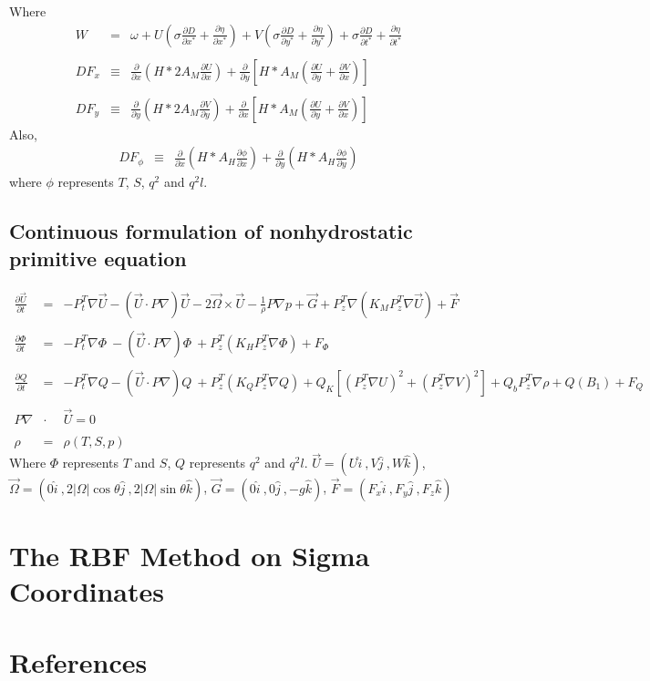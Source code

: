 \documentclass[oribibl]{llncs}
\begin{document}
Where 
\begin{eqnarray}
W&=& \omega +  U\left( \sigma\frac{\partial D}{\partial x^*} +\frac{\partial \eta}{\partial x^*} \right) +V \left(\sigma \frac{\partial D}{\partial y^*}+\frac{\partial \eta}{\partial y^*} \right) + \sigma \frac{\partial D}{\partial t^*} + \frac{\partial \eta}{\partial t^*} \\ \nonumber \\
DF_x &\equiv& \frac{\partial}{\partial x} (H*2A_M\frac{\partial U}{\partial x}) + \frac{\partial}{\partial y} \left [ H*A_M(\frac{\partial U}{\partial y}+\frac{\partial V}{\partial x}) \right] \\ \nonumber \\
DF_y &\equiv& \frac{\partial}{\partial y} (H*2A_M \frac{\partial V}{\partial y}) + \frac{\partial}{\partial x} \left[ H*A_M(\frac{\partial U}{\partial y}+\frac{\partial V}{\partial x}) \right] 
\end{eqnarray}
Also,
\begin{eqnarray}
DF_\phi &\equiv& \frac{\partial}{\partial x}(H*A_H\frac{\partial \phi}{\partial x}) + \frac{\partial}{\partial y}(H*A_H\frac{\partial \phi}{\partial y}) 
\end{eqnarray}
where $\phi$ represents $T$, $S$, $q^2$ and $q^2 l$. \\
\subsection{Continuous formulation of nonhydrostatic primitive equation}
\begin{eqnarray}
\frac{\partial {\vec{U}}}{\partial t} &=& -P^T_t \nabla {\vec{U}} - \left(\vec{U} \cdot P \nabla \right) \vec{U} - 2\vec{\Omega} \times \vec{U}-\frac{1}{\rho}P\nabla p+ \vec{G} + P^T_z \nabla \left( K_M P^T_z \nabla {\vec{U}} \right) + \vec{F} \\ \nonumber \\ 
\frac{\partial {\Phi}}{\partial t}    &=& -P^T_t \nabla \Phi \ - (\vec{U} \cdot P \nabla) \Phi \ + P^T_z \left(K_HP^T_z \nabla \Phi \right)+F_\Phi \\ \nonumber \\ 
\frac{\partial Q}{\partial t} &=& -P^T_t \nabla Q - \left(\vec{U} \cdot P \nabla \right) Q \ +  P^T_z \left(K_QP^T_z \nabla Q \right) + Q_K \left [(P^T_z\nabla U)^2+(P^T_z \nabla V)^2 \right] + Q_b P^T_z \nabla \rho +Q(B_1)  + F_Q \\ \nonumber \\ 
P\nabla  &\cdot  &\vec{U}=0  \\ \nonumber \\ 
\rho &=& \rho(T,S,p)
\end{eqnarray}
Where $\Phi$ represents $T$ and $S$, $Q$ represents $q^2$ and $q^2l$. $\vec{U}=(U \widehat{i} \ ,V \widehat{j} \ ,W \widehat{k})$, $\vec{\Omega}=(0 \widehat{i} \ ,2|\Omega|\cos{\theta} \widehat{j} \ ,2|\Omega| \sin{\theta} \widehat{k})$, $\vec{G}=(0 \widehat{i} \ ,0  \widehat{j} \ ,-g \widehat{k})$, $\vec{F}=(F_x \widehat{i} \ ,F_y \widehat{j} \ ,F_z \widehat{k})$
\section{The RBF Method on Sigma Coordinates}

\section{References}



 
\end{document}
